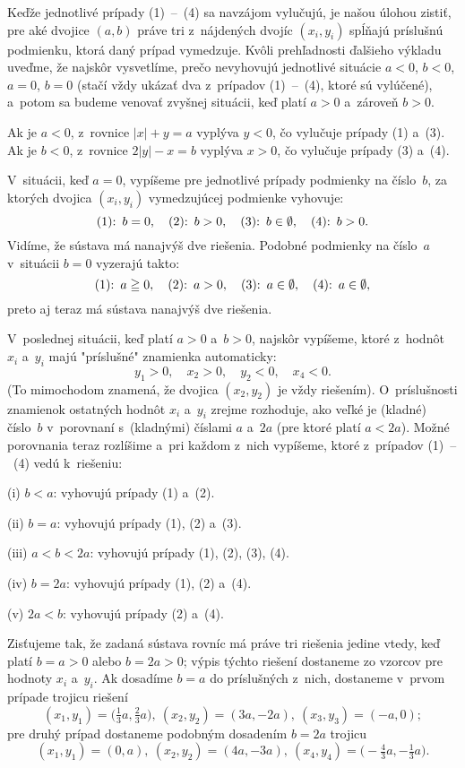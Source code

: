 {Keďže jednotlivé prípady (1)~--~(4)
sa navzájom vylučujú, je našou úlohou zistiť, pre aké dvojice
$(a,b)$ práve tri z~nájdených dvojíc $(x_i,y_i)$ spĺňajú príslušnú podmienku,
ktorá daný prípad vymedzuje. Kvôli prehľadnosti ďalšieho výkladu uveďme,
že najskôr vysvetlíme, prečo nevyhovujú jednotlivé situácie $a<0$, $b<0$,
$a=0$, $b=0$ (stačí vždy ukázať dva z~prípadov (1)~--~(4), ktoré
sú vylúčené), a~potom sa budeme venovať zvyšnej situácii, keď platí
$a>0$ a~zároveň $b>0$.

Ak je $a<0$, z~rovnice $|x|+y=a$ vyplýva $y<0$, čo vylučuje prípady
(1) a~(3). Ak je $b<0$, z~rovnice $2|y|-x=b$ vyplýva $x>0$, čo
vylučuje prípady (3) a~(4).

V~situácii, keď $a=0$, vypíšeme pre jednotlivé
prípady podmienky na číslo~$b$, za ktorých dvojica $(x_i,y_i)$
vymedzujúcej podmienke vyhovuje:
$$
\def\:{\hbox{:\enspace }}
(1)\:b=0,\quad(2)\:b>0,\quad(3)\:b\in\emptyset,\quad(4)\:b>0.
$$
Vidíme, že sústava má nanajvýš dve riešenia.
Podobné podmienky na číslo~$a$ v~situácii $b=0$ vyzerajú takto:
$$
\def\:{\hbox{:\enspace }}
(1)\:a\geqq0,\quad(2)\:a>0,\quad(3)\:a\in\emptyset,\quad(4)\:a\in\emptyset,
$$
preto aj teraz má sústava nanajvýš dve riešenia.

V~poslednej situácii, keď platí $a>0$ a~$b>0$, najskôr vypíšeme, ktoré
z~hodnôt $x_i$ a~$y_i$ majú "príslušné" znamienka automaticky:
$$
y_1>0,\quad x_2>0,\quad y_2<0,\quad x_4<0.
$$
(To mimochodom znamená, že dvojica $(x_2,y_2)$ je vždy riešením).
O~príslušnosti znamienok ostatných hodnôt $x_i$ a~$y_i$
zrejme rozhoduje, ako veľké
je (kladné) číslo~$b$ v~porovnaní s~(kladnými) číslami $a$ a~$2a$
(pre ktoré platí $a<2a$). Možné porovnania teraz rozlíšime a~pri každom z~nich
vypíšeme, ktoré z~prípadov (1)~--~(4) vedú k~riešeniu:
\item{(i)}
$b<a$:
vyhovujú prípady (1) a~(2).
\item{(ii)}
$b=a$:
vyhovujú prípady (1), (2) a~(3).
\item{(iii)}
$a<b<2a$:
vyhovujú prípady (1), (2), (3), (4).
\item{(iv)}
$b=2a$:
vyhovujú prípady (1), (2) a~(4).
\item{(v)}
$2a<b$:
vyhovujú prípady (2) a~(4).

Zisťujeme tak, že zadaná sústava rovníc má práve tri riešenia
jedine vtedy, keď platí $b=a>0$ alebo $b=2a>0$; výpis týchto riešení
dostaneme zo vzorcov pre hodnoty $x_i$ a~$y_i$. Ak dosadíme $b=a$
do príslušných z~nich, dostaneme v~prvom prípade trojicu riešení
$$
(x_1,y_1)=\bigl(\tfrac13 a,\tfrac23a\bigr),\
(x_2,y_2)=(3a,-2a),\
(x_3,y_3)=(- a, 0);
$$
pre druhý prípad dostaneme podobným dosadením $b=2a$ trojicu
$$
(x_1,y_1)=(0,a),\
(x_2,y_2)=(4a,-3a),\
(x_4,y_4)=\bigl(-\tfrac43 a,-\tfrac13 a\bigr).
$$

}
